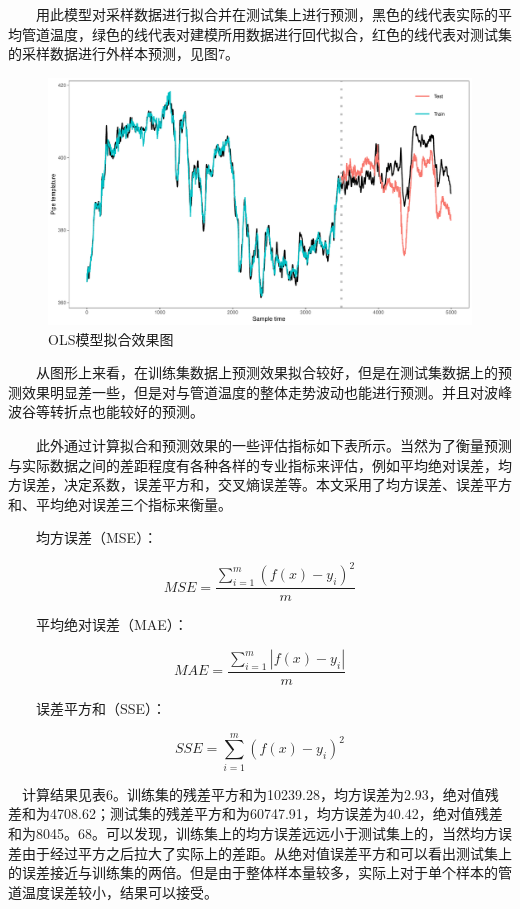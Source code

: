 \documentclass[
]{article}
\begin{document}
  用此模型对采样数据进行拟合并在测试集上进行预测，黑色的线代表实际的平均管道温度，绿色的线代表对建模所用数据进行回代拟合，红色的线代表对测试集的采样数据进行外样本预测，见图7。

\begin{figure}

{\centering \includegraphics{TJRJCP_DuXingx_202105_files/figure-latex/unnamed-chunk-19-1} 

}

\caption{OLS模型拟合效果图}\label{fig:unnamed-chunk-19}
\end{figure}

  从图形上来看，在训练集数据上预测效果拟合较好，但是在测试集数据上的预测效果明显差一些，但是对与管道温度的整体走势波动也能进行预测。并且对波峰波谷等转折点也能较好的预测。

  此外通过计算拟合和预测效果的一些评估指标如下表所示。当然为了衡量预测与实际数据之间的差距程度有各种各样的专业指标来评估，例如平均绝对误差，均方误差，决定系数，误差平方和，交叉熵误差等。本文采用了均方误差、误差平方和、平均绝对误差三个指标来衡量。

  均方误差（MSE）：

\[MSE=\frac{\sum_{i=1}^m(f(x)-y_i)^2}{m}\]

  平均绝对误差（MAE）：

\[MAE=\frac{\sum_{i=1}^m|f(x)-y_i|}{m}\]

  误差平方和（SSE）：

\[SSE=\sum_{i=1}^m(f(x)-y_i)^2\]

 计算结果见表6。训练集的残差平方和为10239.28，均方误差为2.93，绝对值残差和为4708.62；测试集的残差平方和为60747.91，均方误差为40.42，绝对值残差和为8045。68。可以发现，训练集上的均方误差远远小于测试集上的，当然均方误差由于经过平方之后拉大了实际上的差距。从绝对值误差平方和可以看出测试集上的误差接近与训练集的两倍。但是由于整体样本量较多，实际上对于单个样本的管道温度误差较小，结果可以接受。
\end{document}
